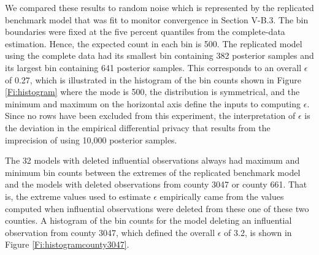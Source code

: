 We compared these results to random noise which is represented by the
replicated benchmark model that was fit to monitor convergence in Section
V-B.3. The bin boundaries were fixed at the five percent quantiles from the
complete-data estimation. Hence, the expected count in each bin is 500. The
replicated model using the complete data had its smallest bin containing 382
posterior samples and its largest bin containing 641 posterior samples. This
corresponds to an overall $\epsilon $ of 0.27, which is illustrated in the
histogram of the bin counts shown in Figure \ref{Fi:histogram} where the
mode is 500, the distribution is symmetrical, and the minimum and maximum on
the horizontal axis define the inputs to computing $\epsilon $. Since no
rows have been excluded from this experiment, the interpretation of $%
\epsilon $ is the deviation in the empirical differential privacy that
results from the imprecision of using 10,000 posterior samples.

The 32 models with deleted influential observations always had maximum and
minimum bin counts between the extremes of the replicated benchmark model
and the models with deleted observations from county 3047 or county 661.
That is, the extreme values used to estimate $\epsilon $ empirically came
from the values computed when influential observations were deleted from
these one of these two counties. A histogram of the bin counts for the model
deleting an influential observation from county 3047, which defined the
overall $\epsilon $ of 3.2, is shown in Figure \ref{Fi:histogramcounty3047}.

